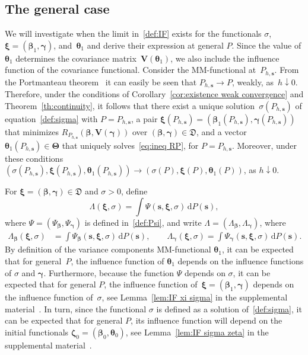 \documentclass{article}
\numberwithin{equation}{section}
\theoremstyle{plain}
\newcommand{\dd}{\mathrm{d}}
\newcommand{\bbeta}{\bm\beta}
\newcommand{\btheta}{\bm\theta}
\newcommand{\bxi}{\bm\xi}
\newcommand{\bgamma}{\bm\gamma}
\newcommand{\bTheta}{\bm\Theta}
\newcommand{\bzeta}{\bm\zeta}
\newcommand{\bs}{\mathbf{s}}
\newcommand{\bV}{\mathbf{V}}
\begin{document}
\subsection{The general case}
\label{subsec:IF general}
We will investigate when the limit in~\eqref{def:IF} exists for the functionals $\sigma$,
$\bxi=(\bbeta_1,\bgamma)$, and~$\btheta_1$ 
and derive their expression at general $P$.
Since the value of $\btheta_1$ determines the covariance matrix~$\bV(\btheta_1)$,
we also include the influence function of the covariance functional.
Consider the MM-functional at~$P_{h,\bs}$.
From the Portmanteau theorem~\cite[Theorem 2.1]{billingsley1968} it can easily be seen that $P_{h,\bs}\to P$, weakly, as~$h\downarrow0$.
Therefore, under the conditions of Corollary~\ref{cor:existence weak convergence} and Theorem~\ref{th:continuity}, it follows
that there exist a unique solution~$\sigma(P_{h,\bs})$ 
of equation~\eqref{def:sigma} with $P=P_{h,\bs}$, 
a pair $\bxi(P_{h,\bs})=(\bbeta_1(P_{h,\bs}),\bgamma(P_{h,\bs}))$ 
that minimizes $R_{P_{h,\bs}}(\bbeta,\bV(\bgamma))$ over $(\bbeta,\bgamma)\in \mathfrak{D}$,
and a vector~$\btheta_1(P_{h,\bs})\in\bTheta$ that uniquely solves~\eqref{eq:ineq RP}, for $P=P_{h,\bs}$.
Moreover, under these conditions 
$(\sigma(P_{h,\bs}),\bxi(P_{h,\bs}),\btheta_1(P_{h,\bs}))\to(\sigma(P),\bxi(P),\btheta_1(P))$,
as $h\downarrow0$.

For $\bxi=(\bbeta,\bgamma)\in \mathfrak{D}$ and $\sigma>0$,
define
\begin{equation}
\label{def:Lambda}
\Lambda(\bxi,\sigma)
=
\int \Psi(\bs,\bxi,\sigma)\,\dd P(\bs),
\end{equation}
where $\Psi=(\Psi_{\bbeta},\Psi_{\bgamma})$ is defined in~\eqref{def:Psi},
and write $\Lambda=(\Lambda_{\bbeta},\Lambda_{\bgamma})$, where
\begin{equation}
\label{def:Lambda-beta-gamma}
\begin{split}
\Lambda_{\bbeta}(\bxi,\sigma)
&=
\int
\Psi_{\bbeta}(\bs,\bxi,\sigma)\,\dd P(\bs),
\qquad
\Lambda_{\bgamma}(\bxi,\sigma)
=
\int
\Psi_{\bgamma}(\bs,\bxi,\sigma)\,\dd P(\bs).
\end{split}
\end{equation}
By definition of the variance components MM-functional $\btheta_1$, 
it can be expected that for general~$P$,
the influence function of $\btheta_1$ depends
on the influence functions of $\sigma$ and $\bgamma$.
Furthermore, because the function $\Psi$ depends on $\sigma$, it can be expected that for general $P$,
the influence function of~$\bxi=(\bbeta_1,\bgamma)$ depends on the influence function of~$\sigma$,
see Lemma~\ref{lem:IF xi sigma} in the supplemental material~\cite{supplement2025}.
In turn, since the functional $\sigma$ is defined as a solution of~\eqref{def:sigma}, it can be expected that for general $P$,
its influence function will depend on the initial functionals $\bzeta_0=(\bbeta_0,\btheta_0)$,
see Lemma~\ref{lem:IF sigma zeta} in the supplemental material~\cite{supplement2025}.
\end{document}
